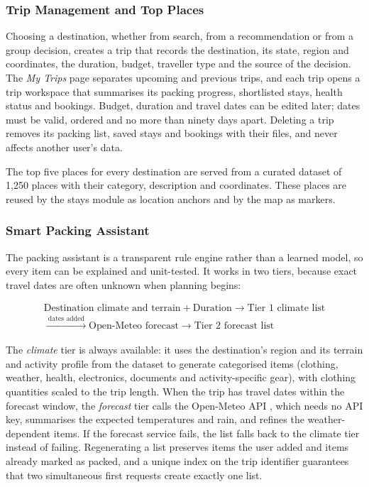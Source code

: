 \subsubsection{Trip Management and Top Places}

Choosing a destination, whether from search, from a recommendation or from a
group decision, creates a trip that records the destination, its state,
region and coordinates, the duration, budget, traveller type and the
source of the decision. The \emph{My Trips} page separates upcoming and
previous trips, and each trip opens a trip workspace that summarises its
packing progress, shortlisted stays, health status and bookings. Budget,
duration and travel dates can be edited later; dates must be valid, ordered
and no more than ninety days apart. Deleting a trip removes its packing list,
saved stays and bookings with their files, and never affects another user's
data.

The top five places for every destination are served from a curated dataset
of 1{,}250 places with their category, description and coordinates. These
places are reused by the stays module as location anchors and by the map as
markers.

\subsubsection{Smart Packing Assistant}

The packing assistant is a transparent rule engine rather than a learned
model, so every item can be explained and unit-tested. It works in two
tiers, because exact travel dates are often unknown when planning begins:

\[
\begin{array}{c}
\text{Destination climate and terrain} + \text{Duration} \rightarrow
\text{Tier 1 climate list} \\[2pt]
\xrightarrow{\ \text{dates added}\ }
\text{Open-Meteo forecast} \rightarrow \text{Tier 2 forecast list}
\end{array}
\]

The \emph{climate} tier is always available: it uses the destination's
region and its terrain and activity profile from the dataset to generate
categorised items (clothing, weather, health, electronics, documents and
activity-specific gear), with clothing quantities scaled to the trip length.
When the trip has travel dates within the forecast window, the
\emph{forecast} tier calls the Open-Meteo API \cite{openmeteo}, which needs
no API key, summarises the expected temperatures and rain, and refines the
weather-dependent items. If the forecast service fails, the list falls back
to the climate tier instead of failing. Regenerating a list preserves items
the user added and items already marked as packed, and a unique index on the
trip identifier guarantees that two simultaneous first requests create
exactly one list.

